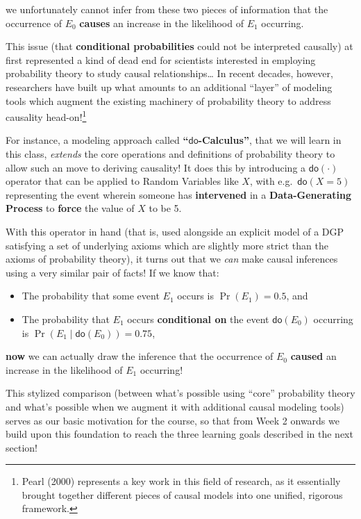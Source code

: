 \documentclass[
]{scrartcl}
\providecommand{\tightlist}{%
  \setlength{\itemsep}{0pt}\setlength{\parskip}{0pt}}\usepackage{longtable,booktabs,array}
\begin{document}
we unfortunately cannot infer from these two pieces of information that
the occurrence of \(E_0\) \textbf{causes} an increase in the likelihood
of \(E_1\) occurring.

This issue (that \textbf{conditional probabilities} could not be
interpreted causally) at first represented a kind of dead end for
scientists interested in employing probability theory to study causal
relationships\ldots{} In recent decades, however, researchers have built
up what amounts to an additional ``layer'' of modeling tools which
augment the existing machinery of probability theory to address
causality head-on!\footnote{Pearl (2000) represents a key work in this
  field of research, as it essentially brought together different pieces
  of causal models into one unified, rigorous framework.}

For instance, a modeling approach called
\textbf{``\(\textsf{do}\)-Calculus''}, that we will learn in this class,
\emph{extends} the core operations and definitions of probability theory
to allow such an move to deriving causality! It does this by introducing
a \(\textsf{do}(\cdot)\) operator that can be applied to Random
Variables like \(X\), with e.g.~\(\textsf{do}(X = 5)\) representing the
event wherein someone has \textbf{intervened} in a
\textbf{Data-Generating Process} to \textbf{force} the value of \(X\) to
be 5.

With this operator in hand (that is, used alongside an explicit model of
a DGP satisfying a set of underlying axioms which are slightly more
strict than the axioms of probability theory), it turns out that we
\emph{can} make causal inferences using a very similar pair of facts! If
we know that:

\begin{itemize}
\tightlist
\item
  The probability that some event \(E_1\) occurs is \(\Pr(E_1) = 0.5\),
  and
\item
  The probability that \(E_1\) occurs \textbf{conditional on} the event
  \(\textsf{do}(E_0)\) occurring is
  \(\Pr(E_1 \mid \textsf{do}(E_0)) = 0.75\),
\end{itemize}

\textbf{now} we can actually draw the inference that the occurrence of
\(E_0\) \textbf{caused} an increase in the likelihood of \(E_1\)
occurring!

This stylized comparison (between what's possible using ``core''
probability theory and what's possible when we augment it with
additional causal modeling tools) serves as our basic motivation for the
course, so that from Week 2 onwards we build upon this foundation to
reach the three learning goals described in the next section!
\end{document}
